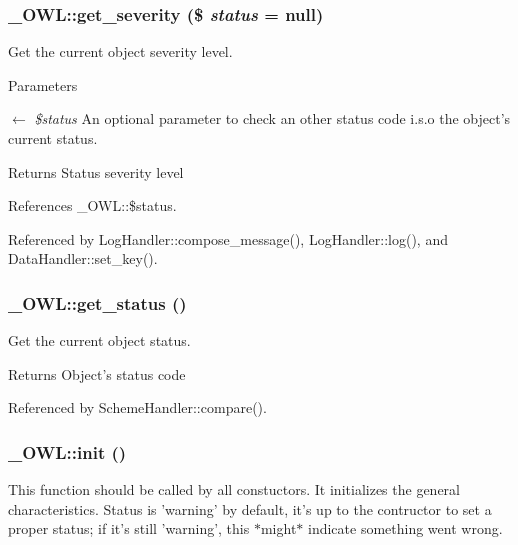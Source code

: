 \subsubsection[{get\_\-severity}]{\setlength{\rightskip}{0pt plus 5cm}\_\-OWL::get\_\-severity (\$ {\em status} = {\ttfamily null})}\label{class__OWL_adf9509ef96858be7bdd9414c5ef129aa}
Get the current object severity level.


\begin{DoxyParams}{Parameters}
\item[\mbox{$\leftarrow$} {\em \$status}]An optional parameter to check an other status code i.s.o the object's current status. \end{DoxyParams}
\begin{DoxyReturn}{Returns}
Status severity level 
\end{DoxyReturn}


References \_\-OWL::\$status.



Referenced by LogHandler::compose\_\-message(), LogHandler::log(), and DataHandler::set\_\-key().

\subsubsection[{get\_\-status}]{\setlength{\rightskip}{0pt plus 5cm}\_\-OWL::get\_\-status ()}\label{class__OWL_a99ec771fa2c5c279f80152cc09e489a8}
Get the current object status.

\begin{DoxyReturn}{Returns}
Object's status code 
\end{DoxyReturn}


Referenced by SchemeHandler::compare().

\subsubsection[{init}]{\setlength{\rightskip}{0pt plus 5cm}\_\-OWL::init ()}\label{class__OWL_ae0ef3ded56e8a6b34b6461e5a721cd3e}
This function should be called by all constuctors. It initializes the general characteristics. Status is 'warning' by default, it's up to the contructor to set a proper status; if it's still 'warning', this $\ast$might$\ast$ indicate something went wrong. 

